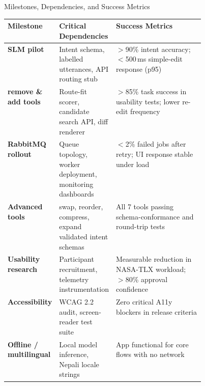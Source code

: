 \documentclass[aspectratio=169,professionalfonts]{beamer}
\begin{document}
\begin{frame}{Milestones, Dependencies, and Success Metrics}
  \begin{table}
    \scriptsize\centering
    \begin{tabularx}{\linewidth}{>{\bfseries}p{0.18\linewidth}
                                  >{\raggedright\arraybackslash}p{0.27\linewidth}
                                  >{\raggedright\arraybackslash}X}
      \toprule
      Milestone & Critical Dependencies & Success Metrics \\
      \midrule
      SLM pilot
        & Intent schema, labelled utterances, API routing stub
        & $>$90\% intent accuracy; $<$500\,ms simple-edit response (p95) \\
      remove \& add tools
        & Route-fit scorer, candidate search API, diff renderer
        & $>$85\% task success in usability tests; lower re-edit frequency \\
      RabbitMQ rollout
        & Queue topology, worker deployment, monitoring dashboards
        & $<$2\% failed jobs after retry; UI response stable under load \\
      Advanced tools
        & swap, reorder, compress, expand validated intent schemas
        & All 7 tools passing schema-conformance and round-trip tests \\
      Usability research
        & Participant recruitment, telemetry instrumentation
        & Measurable reduction in NASA-TLX workload; $>$80\% approval confidence \\
      Accessibility
        & WCAG 2.2 audit, screen-reader test suite
        & Zero critical A11y blockers in release criteria \\
      Offline / multilingual
        & Local model inference, Nepali locale strings
        & App functional for core flows with no network \\
      \bottomrule
    \end{tabularx}
  \end{table}
\end{frame}
\end{document}
